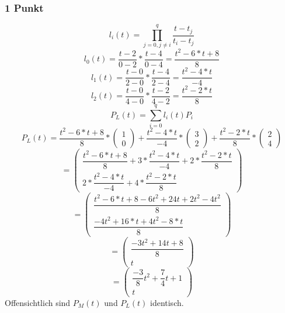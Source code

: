 \subsubsection{1 Punkt}
$$l_{i}(t) = {\displaystyle \prod_{j=0,j \neq i}^{q}} \dfrac{t - t_{j}}{t_{i} - t_{j}}$$
$$l_{0}(t) = \dfrac{t - 2}{0 - 2} * \dfrac{t - 4}{0 - 4} = \dfrac{t^{2} - 6*t + 8}{8}$$
$$l_{1}(t) = \dfrac{t - 0}{2 - 0} * \dfrac{t - 4}{2 - 4} = \dfrac{t^{2} - 4*t }{-4}$$
$$l_{2}(t) = \dfrac{t - 0}{4 - 0} * \dfrac{t - 2}{4 - 2} = \dfrac{t^{2} - 2*t }{8}$$
$$P_{L}(t) = {\displaystyle \sum_{i=0}^{q}} l_{i}(t)P_{i} $$
$$P_{L}(t) = \dfrac{t^{2} - 6*t + 8}{8}*\begin{pmatrix}1\\0\end{pmatrix} + \dfrac{t^{2} - 4*t }{-4}*\begin{pmatrix}3\\2\end{pmatrix}  +  \dfrac{t^{2} - 2*t }{8} *\begin{pmatrix}2\\4\end{pmatrix} $$
$$ = \begin{pmatrix}
\dfrac{t^{2} - 6*t + 8}{8} + 3*\dfrac{t^{2} - 4*t }{-4} + 2*\dfrac{t^{2} - 2*t }{8}\\
2*\dfrac{t^{2} - 4*t }{-4} + 4*\dfrac{t^{2} - 2*t }{8}
\end{pmatrix} $$
$$ = \begin{pmatrix}
\dfrac{t^{2} - 6*t + 8 - 6t^2 +24t + 2t^2 -4t^2}{8}\\
\dfrac{-4t^{2} + 16*t  + 4t^{2} - 8*t }{8}
\end{pmatrix} $$
$$ = \begin{pmatrix}
\dfrac{-3t^2 +14t + 8}{8}\\
t
\end{pmatrix} $$
$$ = \begin{pmatrix}
\dfrac{-3}{8}t^2 +\dfrac{7}{4}t + 1\\
t
\end{pmatrix} $$
Offensichtlich sind $P_{M}(t)$ und $P_{L}(t)$ identisch.
